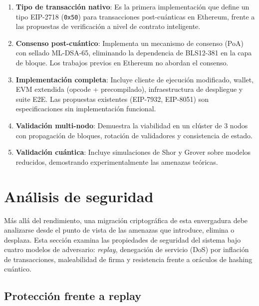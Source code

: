 \begin{enumerate}
  \item \textbf{Tipo de transacción nativo}: Es la primera implementación que define un tipo EIP-2718 (\texttt{0x50}) para transacciones post-cuánticas en Ethereum, frente a las propuestas de verificación a nivel de contrato inteligente.
  
  \item \textbf{Consenso post-cuántico}: Implementa un mecanismo de consenso (PoA) con sellado ML-DSA-65, eliminando la dependencia de BLS12-381 en la capa de bloque. Los trabajos previos en Ethereum no abordan el consenso.
  
  \item \textbf{Implementación completa}: Incluye cliente de ejecución modificado, wallet, EVM extendida (opcode + precompilado), infraestructura de despliegue y suite E2E. Las propuestas existentes (EIP-7932, EIP-8051) son especificaciones sin implementación funcional.
  
  \item \textbf{Validación multi-nodo}: Demuestra la viabilidad en un clúster de 3 nodos con propagación de bloques, rotación de validadores y consistencia de estado.
  
  \item \textbf{Validación cuántica}: Incluye simulaciones de Shor y Grover sobre modelos reducidos, demostrando experimentalmente las amenazas teóricas.
\end{enumerate}


\section{Análisis de seguridad}
\label{sec:res_security}

Más allá del rendimiento, una migración criptográfica de esta envergadura debe analizarse desde el punto de vista de las amenazas que introduce, elimina o desplaza. Esta sección examina las propiedades de seguridad del sistema bajo cuatro modelos de adversario: \emph{replay}, denegación de servicio (DoS) por inflación de transacciones, maleabilidad de firma y resistencia frente a oráculos de hashing cuántico.

\subsection{Protección frente a replay}
\label{sec:sec_replay}

